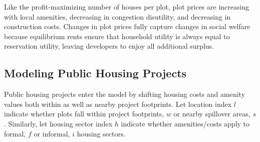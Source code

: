 \documentclass[12pt]{article}
\begin{document}
Like the profit-maximizing number of houses per plot, plot prices are increasing with local amenities, decreasing in congestion disutility, and decreasing in construction costs.  Changes in plot prices fully capture changes in social welfare because equilibrium rents ensure that household utility is always equal to reservation utility, leaving developers to enjoy all additional surplus. 









\subsection{Modeling Public Housing Projects}

Public housing projects enter the model by shifting housing costs and amenity values both within as well as nearby project footprints.  Let location index $l$ indicate whether plots fall within project footprints, $w$ or nearby spillover areas, $s$.  Similarly, let housing sector index $h$ indicate whether amenities/costs apply to formal, $f$ or informal, $i$ housing sectors.
\end{document}
